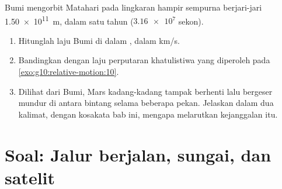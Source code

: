 \begin{exercise}[$\star\star\star$]\label{exo:g10:relative-motion:15}
Bumi mengorbit Matahari pada lingkaran hampir sempurna berjari-jari
\qty{1.50e11}{m}, dalam satu tahun ($\num{3.16e7}$ sekon).
\begin{enumerate}
  \item Hitunglah laju Bumi di dalam , dalam
        \unit{km/s}.
  \item Bandingkan dengan laju perputaran khatulistiwa yang diperoleh
        pada \cref{exo:g10:relative-motion:10}.
  \item Dilihat dari Bumi, Mars kadang-kadang tampak berhenti lalu
        bergeser mundur di antara bintang selama beberapa pekan.
        Jelaskan dalam dua kalimat, dengan kosakata bab ini, mengapa
         melarutkan kejanggalan itu.
\end{enumerate}
\end{exercise}

\section{Soal: Jalur berjalan, sungai, dan satelit}

